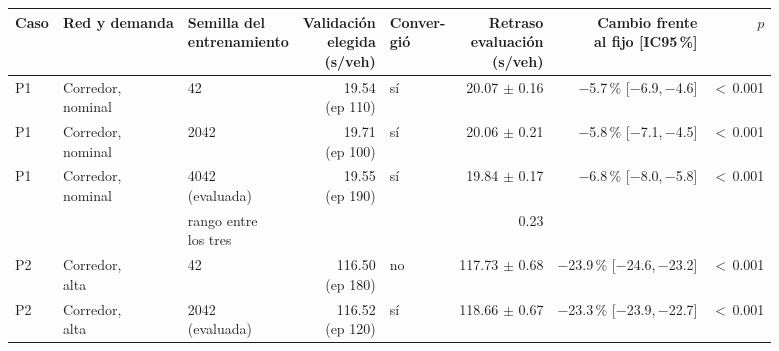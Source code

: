 \begin{table}[H]
\centering
\scriptsize
\setlength{\tabcolsep}{3pt}
\begin{tabular}{lllrlrrr}
\toprule
Caso & Red y demanda & \makecell{Semilla del\\entrenamiento} & \makecell{Validación\\elegida\\(s/veh)} & \makecell{Conver-\\gió} & \makecell{Retraso\\evaluación\\(s/veh)} & \makecell{Cambio frente\\al fijo [IC95\,\%]} & $p$ \\
\midrule
P1 & \makecell[l]{Corredor,\\{}nominal} & 42 & \makecell[r]{19.54\\{}(ep 110)} & sí & \makecell[r]{20.07\\{}$\pm$ 0.16} & \makecell[r]{$-$5.7\,\%\\{}[$-$6.9,\,$-$4.6]} & $<$\,0.001 \\
P1 & \makecell[l]{Corredor,\\{}nominal} & 2042 & \makecell[r]{19.71\\{}(ep 100)} & sí & \makecell[r]{20.06\\{}$\pm$ 0.21} & \makecell[r]{$-$5.8\,\%\\{}[$-$7.1,\,$-$4.5]} & $<$\,0.001 \\
P1 & \makecell[l]{Corredor,\\{}nominal} & \makecell[l]{4042\\{}(evaluada)} & \makecell[r]{19.55\\{}(ep 190)} & sí & \makecell[r]{19.84\\{}$\pm$ 0.17} & \makecell[r]{$-$6.8\,\%\\{}[$-$8.0,\,$-$5.8]} & $<$\,0.001 \\
 & & \makecell[l]{rango entre\\{}los tres} & & & 0.23 & & \\
P2 & \makecell[l]{Corredor,\\{}alta} & 42 & \makecell[r]{116.50\\{}(ep 180)} & no & \makecell[r]{117.73\\{}$\pm$ 0.68} & \makecell[r]{$-$23.9\,\%\\{}[$-$24.6,\,$-$23.2]} & $<$\,0.001 \\
P2 & \makecell[l]{Corredor,\\{}alta} & \makecell[l]{2042\\{}(evaluada)} & \makecell[r]{116.52\\{}(ep 120)} & sí & \makecell[r]{118.66\\{}$\pm$ 0.67} & \makecell[r]{$-$23.3\,\%\\{}[$-$23.9,\,$-$22.7]} & $<$\,0.001 \\

\end{tabular}
\end{table}
